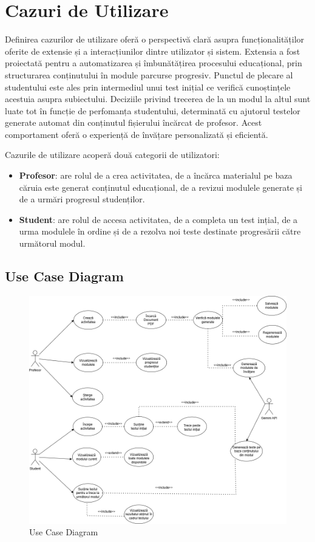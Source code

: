 \chapter{Cazuri de Utilizare}

Definirea cazurilor de utilizare oferă o perspectivă clară asupra funcționalităților oferite de extensie și a interacțiunilor dintre utilizator și sistem. Extensia a fost proiectată pentru 
a automatizarea și îmbunătățirea procesului educațional, prin structurarea conținutului în module parcurse progresiv. Punctul de plecare al studentului este ales prin intermediul unui 
test inițial ce verifică cunoștințele acestuia asupra subiectului. Deciziile privind trecerea de la un modul la altul sunt luate tot în funcție de perfomanța studentului, determinată cu 
ajutorul testelor generate automat din conținutul fișierului încărcat de profesor. Acest comportament oferă o experiență de învățare personalizată și eficientă.

Cazurile de utilizare acoperă două categorii de utilizatori:
\begin{itemize}
    \item \textbf{Profesor}: are rolul de a crea activitatea, de a încărca materialul pe baza căruia este generat conținutul educațional, de a revizui modulele generate și de a urmări progresul studenților.
    \item \textbf{Student}: are rolul de accesa activitatea, de a completa un test ințial, de a urma modulele în ordine și de a rezolva noi teste destinate progresării către următorul modul.
\end{itemize}

\section{Use Case Diagram}
\begin{figure}[H]
    \centering
    \includegraphics[width=1\textwidth]{images/LicentaUseCase.png}
    \caption{Use Case Diagram}
    \label{fig:use_case_diagram}
\end{figure}

